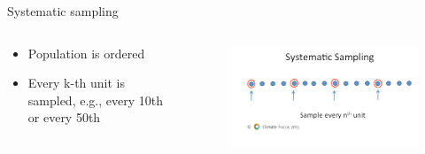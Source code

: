 \documentclass[10pt, compress]{beamer}
\begin{document}
\begin{frame}[t]{Systematic sampling}
    \begin{columns}
        \begin{block}{}
            \begin{itemize}
                \item Population is ordered
                \item Every k-th unit is sampled, e.g., every 10th or every 50th
            \end{itemize}
        \end{block}
        \begin{block}{}
            \begin{figure}
                \begin{center}
                    \includegraphics[scale=0.25]{img/Slide4.png}
                \end{center}
            \end{figure}
        \end{block}
    \end{columns}

\end{frame}
\end{document}
